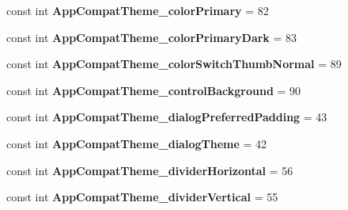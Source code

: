 \begin{DoxyCompactItemize}
\item 
\mbox{\label{class_sample_app_1_1_droid_1_1_resource_1_1_styleable_ae2d884459a8291696942ad3f2ca4a561}} 
const int {\bfseries App\+Compat\+Theme\+\_\+color\+Primary} = 82
\item 
\mbox{\label{class_sample_app_1_1_droid_1_1_resource_1_1_styleable_a816fab60dce0a516cd92a05340ca59fd}} 
const int {\bfseries App\+Compat\+Theme\+\_\+color\+Primary\+Dark} = 83
\item 
\mbox{\label{class_sample_app_1_1_droid_1_1_resource_1_1_styleable_ac3dbd73dede2f564d7aeb93cc5d63876}} 
const int {\bfseries App\+Compat\+Theme\+\_\+color\+Switch\+Thumb\+Normal} = 89
\item 
\mbox{\label{class_sample_app_1_1_droid_1_1_resource_1_1_styleable_a103fb1e9460b81646daa5982127f36cc}} 
const int {\bfseries App\+Compat\+Theme\+\_\+control\+Background} = 90
\item 
\mbox{\label{class_sample_app_1_1_droid_1_1_resource_1_1_styleable_ab34d8d5d0ba7153c16a83609488d53cc}} 
const int {\bfseries App\+Compat\+Theme\+\_\+dialog\+Preferred\+Padding} = 43
\item 
\mbox{\label{class_sample_app_1_1_droid_1_1_resource_1_1_styleable_a2b49ecc8ecf6cd3c1d518df97acfd363}} 
const int {\bfseries App\+Compat\+Theme\+\_\+dialog\+Theme} = 42
\item 
\mbox{\label{class_sample_app_1_1_droid_1_1_resource_1_1_styleable_afb26d98d7325569197f012dedba83fc7}} 
const int {\bfseries App\+Compat\+Theme\+\_\+divider\+Horizontal} = 56
\item 
\mbox{\label{class_sample_app_1_1_droid_1_1_resource_1_1_styleable_a1690a8f78485e6dd23b3d46b0aae3265}} 
const int {\bfseries App\+Compat\+Theme\+\_\+divider\+Vertical} = 55
\item 

\end{DoxyCompactItemize}

